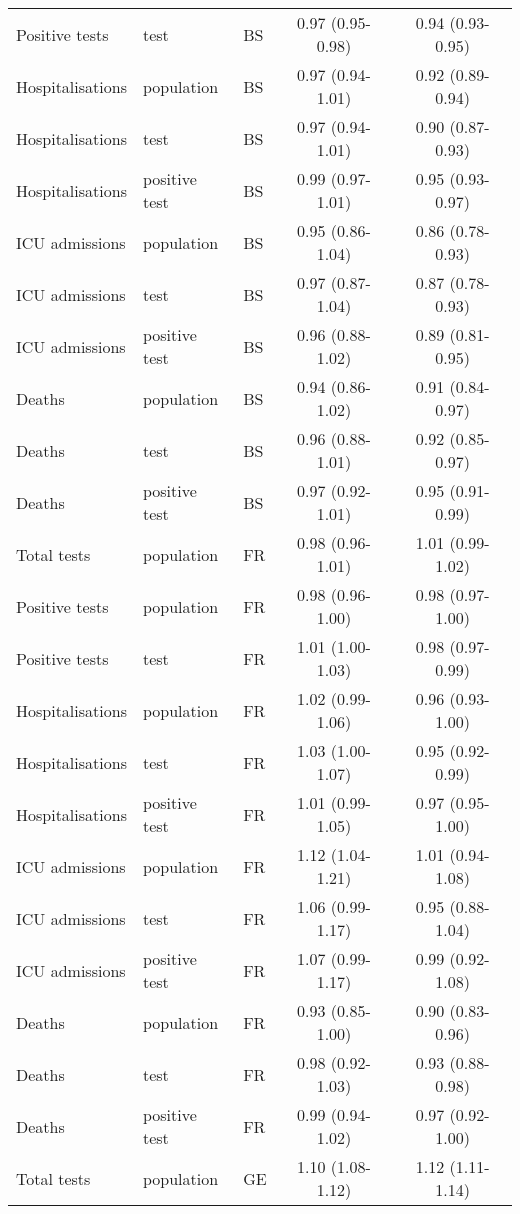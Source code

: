 \documentclass{article}
\begin{document}
\begin{longtable}{lllcc}
		Positive tests & test & BS & 0.97 (0.95-0.98) & 0.94 (0.93-0.95) \\ 
		Hospitalisations & population & BS & 0.97 (0.94-1.01) & 0.92 (0.89-0.94) \\ 
		Hospitalisations & test & BS & 0.97 (0.94-1.01) & 0.90 (0.87-0.93) \\ 
		Hospitalisations & positive test & BS & 0.99 (0.97-1.01) & 0.95 (0.93-0.97) \\ 
		ICU admissions & population & BS & 0.95 (0.86-1.04) & 0.86 (0.78-0.93) \\ 
		ICU admissions & test & BS & 0.97 (0.87-1.04) & 0.87 (0.78-0.93) \\ 
		ICU admissions & positive test & BS & 0.96 (0.88-1.02) & 0.89 (0.81-0.95) \\ 
		Deaths & population & BS & 0.94 (0.86-1.02) & 0.91 (0.84-0.97) \\ 
		Deaths & test & BS & 0.96 (0.88-1.01) & 0.92 (0.85-0.97) \\ 
		Deaths & positive test & BS & 0.97 (0.92-1.01) & 0.95 (0.91-0.99) \\ 
		Total tests & population & FR & 0.98 (0.96-1.01) & 1.01 (0.99-1.02) \\ 
		Positive tests & population & FR & 0.98 (0.96-1.00) & 0.98 (0.97-1.00) \\ 
		Positive tests & test & FR & 1.01 (1.00-1.03) & 0.98 (0.97-0.99) \\ 
		Hospitalisations & population & FR & 1.02 (0.99-1.06) & 0.96 (0.93-1.00) \\ 
		Hospitalisations & test & FR & 1.03 (1.00-1.07) & 0.95 (0.92-0.99) \\ 
		Hospitalisations & positive test & FR & 1.01 (0.99-1.05) & 0.97 (0.95-1.00) \\ 
		ICU admissions & population & FR & 1.12 (1.04-1.21) & 1.01 (0.94-1.08) \\ 
		ICU admissions & test & FR & 1.06 (0.99-1.17) & 0.95 (0.88-1.04) \\ 
		ICU admissions & positive test & FR & 1.07 (0.99-1.17) & 0.99 (0.92-1.08) \\ 
		Deaths & population & FR & 0.93 (0.85-1.00) & 0.90 (0.83-0.96) \\ 
		Deaths & test & FR & 0.98 (0.92-1.03) & 0.93 (0.88-0.98) \\ 
		Deaths & positive test & FR & 0.99 (0.94-1.02) & 0.97 (0.92-1.00) \\ 
		Total tests & population & GE & 1.10 (1.08-1.12) & 1.12 (1.11-1.14) \\ 

\end{longtable}
\end{document}
